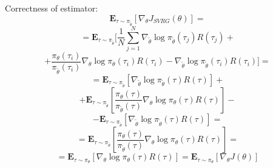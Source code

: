 \documentclass{article}
\theoremstyle{remark}
\theoremstyle{definition}
\begin{document}
Correctness of estimator: 
\begin{displaymath}\mathbf{E}_{\tau \sim \pi_{\tilde{\theta}}}[\nabla_\theta J_{SVRG}(\theta)] = \end{displaymath}\begin{displaymath}=\mathbf{E}_{\tau \sim \pi_{\tilde{\theta}}}[\frac{1}{N}\sum_{j=1}^N\nabla_{\tilde{\theta}} \log \pi_{\tilde{\theta}}(\tau_j) R(\tau_j) + \end{displaymath}\begin{displaymath}+\frac{\pi_{\theta}(\tau_i)}{\pi_{\tilde{\theta}}(\tau_i)}\nabla_{\theta} \log \pi_{\theta}(\tau_i) R(\tau_i) - \nabla_{\tilde{\theta}} \log \pi_{\tilde{\theta}}(\tau_i) R(\tau_i)]=\end{displaymath}\begin{displaymath}= \mathbf{E}_{\tau \sim \pi_{\tilde{\theta}}}[\nabla_{\tilde{\theta}} \log \pi_{\tilde{\theta}}(\tau) R(\tau)]+\end{displaymath}\begin{displaymath} + \mathbf{E}_{\tau \sim \pi_{\tilde{\theta}}}[\frac{\pi_{\theta}(\tau)}{\pi_{\tilde{\theta}}(\tau)}\nabla_{\theta} \log \pi_{\theta}(\tau) R(\tau)]-\end{displaymath}\begin{displaymath}- \mathbf{E}_{\tau \sim \pi_{\tilde{\theta}}}[\nabla_{\tilde{\theta}} \log \pi_{\tilde{\theta}}(\tau) R(\tau)] =\end{displaymath}
\begin{displaymath}=\mathbf{E}_{\tau \sim \pi_{\tilde{\theta}}}[\frac{\pi_{\theta}(\tau)}{\pi_{\tilde{\theta}}(\tau)}\nabla_{\theta} \log \pi_{\theta}(\tau) R(\tau)]=\end{displaymath}\begin{displaymath}=\mathbf{E}_{\tau \sim \pi_{\theta}}[\nabla_{\theta}\log \pi_{\theta}(\tau) R(\tau)]=\mathbf{E}_{\tau \sim \pi_{\theta}}[\nabla_\theta J(\theta)]\end{displaymath}
\end{document}
